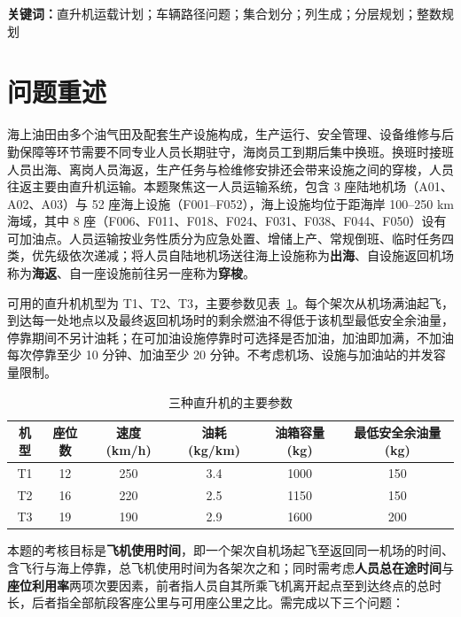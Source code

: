 \documentclass[zihao=-4,a4paper]{ctexart}
\begin{document}
\vspace{1em}
\noindent\textbf{关键词：}直升机运载计划；车辆路径问题；集合划分；列生成；分层规划；整数规划

\newpage

\section{问题重述}

海上油田由多个油气田及配套生产设施构成，生产运行、安全管理、设备维修与后勤保障等环节需要不同专业人员长期驻守，海岗员工到期后集中换班。换班时接班人员出海、离岗人员海返，生产任务与检维修安排还会带来设施之间的穿梭，人员往返主要由直升机运输。本题聚焦这一人员运输系统，包含 3 座陆地机场（A01、A02、A03）与 52 座海上设施（F001--F052），海上设施均位于距海岸 100--250 km 海域，其中 8 座（F006、F011、F018、F024、F031、F038、F044、F050）设有可加油点。人员运输按业务性质分为应急处置、增储上产、常规倒班、临时任务四类，优先级依次递减；将人员自陆地机场送往海上设施称为\textbf{出海}、自设施返回机场称为\textbf{海返}、自一座设施前往另一座称为\textbf{穿梭}。

可用的直升机机型为 T1、T2、T3，主要参数见表~\ref{tab:aircraft}。每个架次从机场满油起飞，到达每一处地点以及最终返回机场时的剩余燃油不得低于该机型最低安全余油量，停靠期间不另计油耗；在可加油设施停靠时可选择是否加油，加油即加满，不加油每次停靠至少 10 分钟、加油至少 20 分钟。不考虑机场、设施与加油站的并发容量限制。

\begin{table}[H]
  \centering
  \caption{三种直升机的主要参数}
  \label{tab:aircraft}
  \begin{tabular}{cccccc}
    \toprule
    机型 & 座位数 & 速度 (km/h) & 油耗 (kg/km) & 油箱容量 (kg) & 最低安全余油量 (kg) \\
    \midrule
    T1 & 12 & 250 & 3.4 & 1000 & 150 \\
    T2 & 16 & 220 & 2.5 & 1150 & 150 \\
    T3 & 19 & 190 & 2.9 & 1600 & 200 \\
    \bottomrule
  \end{tabular}
\end{table}

本题的考核目标是\textbf{飞机使用时间}，即一个架次自机场起飞至返回同一机场的时间、含飞行与海上停靠，总飞机使用时间为各架次之和；同时需考虑\textbf{人员总在途时间}与\textbf{座位利用率}两项次要因素，前者指人员自其所乘飞机离开起点至到达终点的总时长，后者指全部航段客座公里与可用座公里之比。需完成以下三个问题：
\end{document}
